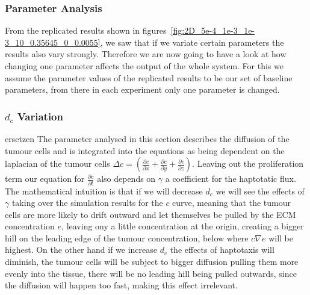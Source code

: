 \subsubsection{Parameter Analysis}
From the replicated results shown in figures~\ref{fig:2D_5e-4_1e-3_1e-3_10_0.35645_0_0.0055}, we saw that if we variate certain parameters the results also vary strongly. Therefore we are now going to have a look at how changing one parameter affects the output of the whole system. For this we assume the parameter values of the replicated results to be our set of baseline parameters, from there in each experiment only one parameter is changed. 
\subsubsection*{$d_c$ Variation}ersetzen
The parameter analysed in this section describes the diffusion of the tumour cells and is integrated into the equations as being dependent on the laplacian of the tumour cells $\Delta c = (\frac{\partial c}{\partial x} + \frac{\partial c}{\partial y} + \frac{\partial c}{\partial z})$. Leaving out the proliferation term our equation for $\frac{\partial c}{\partial t}$ also depends on $\gamma$ a coefficient for the haptotatic flux. The mathematical intuition is that if we will decrease $d_c$ we will see the effects of $\gamma$ taking over the simulation results for the $c$ curve, meaning that the tumour cells are more likely to drift outward and let themselves be pulled by the ECM concentration $e$, leaving ony a little concentration at the origin, creating a bigger hill on the leading edge of the tumour concentration, below where $c \nabla e$ will be highest. On the other hand if we increase $d_c$ the effects of haptotaxis will diminish, the tumour cells will be subject to bigger diffusion pulling them more evenly into the tissue, there will be no leading hill being pulled outwards, since the diffusion will happen too fast, making this effect irrelevant. 
